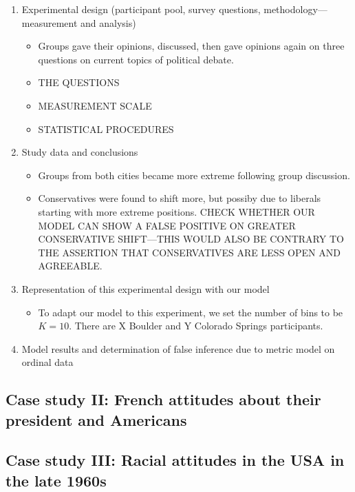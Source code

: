 \documentclass[11pt,letterpaper]{article}
\begin{document}
\begin{enumerate}
  \item Experimental design (participant pool, survey questions,
    methodology---measurement and analysis)
    \begin{itemize}
      \item 
        Groups gave their opinions, discussed, then gave opinions again on
        three questions on current topics of political debate.
      \item
        THE QUESTIONS
      \item
        MEASUREMENT SCALE
      \item
        STATISTICAL PROCEDURES
    \end{itemize}
  \item Study data and conclusions 
    \begin{itemize}
      \item 
        Groups from both cities became more extreme following group discussion.
      \item
        Conservatives were found to shift more, but possiby due to liberals 
        starting with more extreme positions. CHECK WHETHER OUR MODEL CAN
        SHOW A FALSE POSITIVE ON GREATER CONSERVATIVE SHIFT---THIS WOULD ALSO BE
        CONTRARY TO THE ASSERTION THAT CONSERVATIVES ARE LESS OPEN AND AGREEABLE.
    \end{itemize}
  \item Representation of this experimental design with our model
    \begin{itemize}
      \item To adapt our model to this experiment, we set the number of 
        bins to be $K=10$. There are X Boulder and Y Colorado Springs participants.
    \end{itemize}
  \item Model results and determination of false inference due to 
    metric model on ordinal data
\end{enumerate}

\subsection{Case study II: French attitudes about their president and Americans}



\subsection{Case study III: Racial attitudes in the USA in the late 1960s}
\end{document}
